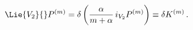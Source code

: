 \begin{equation}\label{eq:Lagr-pair-KdV}
  \Lie{V_{2}}{}P^{(m)} = \delta \left(\frac{\alpha}{m +
\alpha}\,i_{V_{2}}P^{(m)}\right) \equiv \delta  K^{(m)}\,.
\end{equation}

